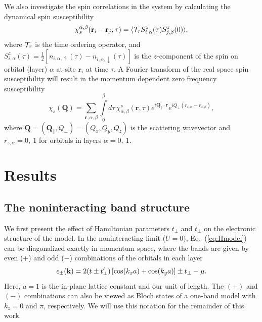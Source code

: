 \documentclass[prb,twocolumn,amsmath,amssymb,superscriptaddress,floatfix,nofootinbib]{revtex4-2}
\begin{document}
We also investigate the spin correlations in the system by calculating the dynamical spin susceptibility 
\begin{equation}
    \chi^{\alpha,\beta}_{s}(\mathbf{r}_i-\mathbf{r}_j,\tau) = \langle {\cal T}_\tau S_{i,\alpha}^{z}(\tau)S_{j,\beta}^{z}(0)\rangle,
\end{equation}
where ${\cal T}_\tau$ is the time ordering operator, and  $S_{i,\alpha}^{z}(\tau)= \frac{1}{2}\left[n_{i,\alpha,\uparrow}(\tau)-n_{i,\alpha,\downarrow}(\tau)\right]$ is the $z$-component of the spin on orbital (layer) $\alpha$ at site $\mathbf{r}_i$ at time $\tau$. A Fourier transform of the real space spin susceptibility will result in the momentum dependent zero frequency susceptibility 
\begin{equation}\label{eq:spinsus}
    \chi_{s}(\mathbf{Q}) = \sum_{\mathbf{r},\alpha,\beta} \int\limits_0^\beta d\tau\, \chi_{\alpha,\beta}^{s}(\mathbf{r},\tau) e^{i\mathbf{Q_{\parallel}}\cdot \mathbf{r}} e^{iQ_{\perp}(r_{z,\alpha}-r_{z,\beta})} ,
\end{equation}
where $\mathbf{Q} = (\mathbf{Q}_{\parallel}, Q_{\perp}) = (Q_x,Q_y, Q_z)$ is the scattering wavevector and $r_{z,\alpha} = 0,~1$ for orbitals in layers $\alpha = 0,~1$.

\section{Results}
\subsection{The noninteracting band structure}

We first present the effect of Hamiltonian parameters $t^{\phantom\prime}_\perp$ and $t_\perp^\prime$ on the electronic structure of the model. In the noninteracting limit ($U = 0$), Eq.~(\ref{eq:Hmodel}) can be diagonalized exactly in momentum space, where the bands are given by even ($+$) and odd ($-$) combinations of the orbitals in each layer \cite{KurokiFlex2020}
\begin{equation}\label{eq:epsilon0}
    \epsilon_\pm({\bf k})= 2(t\pm t_\perp^\prime)\left[\cos(k_xa)+\cos(k_ya)\right] \pm  t_\perp - \mu. 
\end{equation}
Here, $a=1$ is the in-plane lattice constant and our unit of length. The $(+)$ and $(-)$ combinations can also be viewed as Bloch states of a one-band model with $k_z = 0$ and $\pi$, respectively. We will use this notation for the remainder of this work. 
\end{document}
